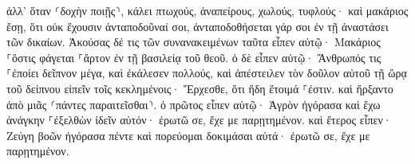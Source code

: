 \documentclass{openreader}
\begin{document}
ἀλλ’ ὅταν ⸂δοχὴν ποιῇς⸃, κάλει πτωχούς, ἀναπείρους, χωλούς, τυφλούς· 
καὶ μακάριος ἔσῃ, ὅτι οὐκ ἔχουσιν ἀνταποδοῦναί σοι, ἀνταποδοθήσεται γάρ σοι ἐν τῇ ἀναστάσει τῶν δικαίων. 
Ἀκούσας δέ τις τῶν συνανακειμένων ταῦτα εἶπεν αὐτῷ· Μακάριος ⸀ὅστις φάγεται ⸀ἄρτον ἐν τῇ βασιλείᾳ τοῦ θεοῦ. 
ὁ δὲ εἶπεν αὐτῷ· Ἄνθρωπός τις ⸀ἐποίει δεῖπνον μέγα, καὶ ἐκάλεσεν πολλούς, 
καὶ ἀπέστειλεν τὸν δοῦλον αὐτοῦ τῇ ὥρᾳ τοῦ δείπνου εἰπεῖν τοῖς κεκλημένοις· Ἔρχεσθε, ὅτι ἤδη ἕτοιμά ⸀ἐστιν. 
καὶ ἤρξαντο ἀπὸ μιᾶς ⸂πάντες παραιτεῖσθαι⸃. ὁ πρῶτος εἶπεν αὐτῷ· Ἀγρὸν ἠγόρασα καὶ ἔχω ἀνάγκην ⸀ἐξελθὼν ἰδεῖν αὐτόν· ἐρωτῶ σε, ἔχε με παρῃτημένον. 
καὶ ἕτερος εἶπεν· Ζεύγη βοῶν ἠγόρασα πέντε καὶ πορεύομαι δοκιμάσαι αὐτά· ἐρωτῶ σε, ἔχε με παρῃτημένον. 
\end{document}
